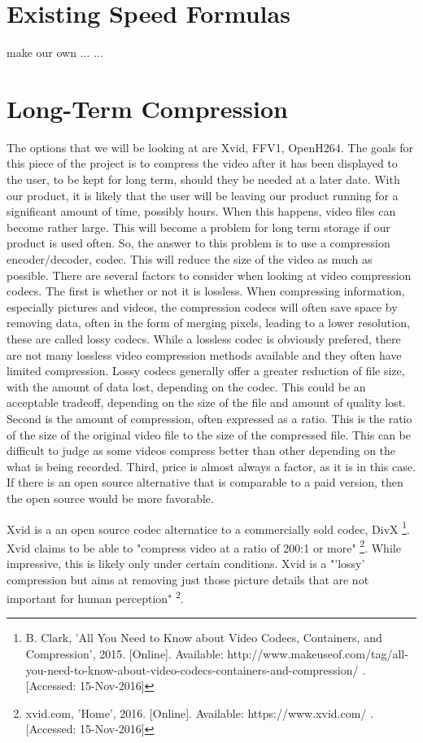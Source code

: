 \documentclass[letterpaper,10pt,onecolumn,draftclsnofoot]{IEEEtran}
\begin{document}
\section{Existing Speed Formulas} %

make our own
...
...

\newpage

\section{Long-Term Compression} %

The options that we will be looking at are Xvid, FFV1, OpenH264.
The goals for this piece of the project is to compress the video after it has been displayed to the user, to be kept for long term, should they be needed at a later date.
With our product, it is likely that the user will be leaving our product running for a significant amount of time, possibly hours.
When this happens, video files can become rather large.
This will become a problem for long term storage if our product is used often.
So, the answer to this problem is to use a compression encoder/decoder, codec.
This will reduce the size of the video as much as possible.
There are several factors to consider when looking at video compression codecs.
The first is whether or not it is lossless.
When compressing information, especially pictures and videos, the compression codecs will often save space by removing data, often in the form of merging pixels, leading to a lower resolution, these are called lossy codecs.
While a lossless codec is obviously prefered, there are not many lossless video compression methods available and they often have limited compression.
Lossy codecs generally offer a greater reduction of file size, with the amount of data lost, depending on the codec.
This could be an acceptable tradeoff, depending on the size of the file and amount of quality lost.
Second is the amount of compression, often expressed as a ratio.
This is the ratio of the size of the original video file to the size of the compressed file.
This can be difficult to judge as some videos compress better than other depending on the what is being recorded.
Third, price is almost always a factor, as it is in this case.
If there is an open source alternative that is comparable to a paid version, then the open source would be more favorable.

Xvid is a an open source codec alternatice to a commercially sold codec, DivX \footnote{B. Clark, 'All You Need to Know about Video Codecs, Containers, and Compression', 2015. [Online]. Available: http://www.makeuseof.com/tag/all-you-need-to-know-about-video-codecs-containers-and-compression/ . [Accessed: 15-Nov-2016]}. %
Xvid claims to be able to "compress video at a ratio of 200:1 or more" \footnote{xvid.com, 'Home', 2016. [Online]. Available: https://www.xvid.com/ . [Accessed: 15-Nov-2016]}. %
While impressive, this is likely only under certain conditions.
Xvid is a "'lossy' compression but aims at removing just those picture details that are not important for human perception" \textsuperscript{2}. %
\end{document}
